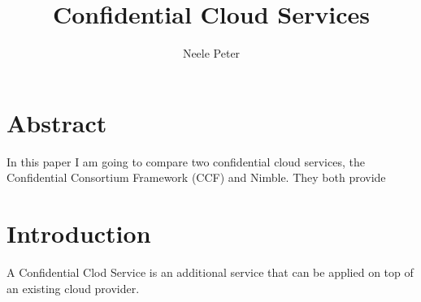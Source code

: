 \documentclass[acmtog]{acmart}
\title{Confidential Cloud Services}
\author{Neele Peter}
\begin{document}
	
	
\maketitle

\tableofcontents
\section{Abstract}	
	In this paper I am going to compare two confidential cloud services, the Confidential Consortium Framework (CCF) and Nimble. They both provide 

\section{Introduction}
	A Confidential Clod Service is an additional service that can be applied on top of an existing cloud provider. 
\end{document}

